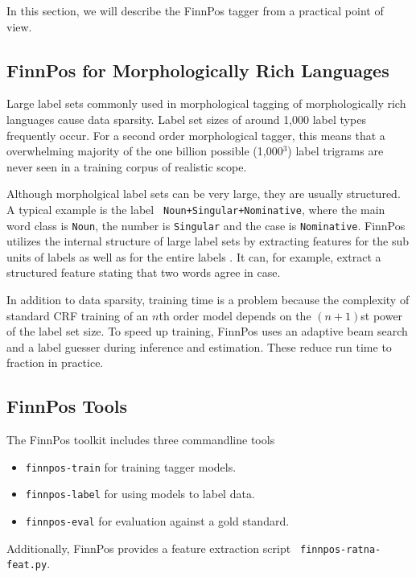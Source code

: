 \documentclass{llncs}
\begin{document}
In this section, we will describe the FinnPos tagger from a
practical point of view.

\subsection{FinnPos for Morphologically Rich Languages}

Large label sets commonly used in morphological tagging of
morphologically rich languages cause data sparsity. Label set sizes of
around 1,000 label types frequently occur. For a second order
morphological tagger, this means that a overwhelming majority of the
one billion possible (1,000$^3$) label trigrams are never seen in a
training corpus of realistic scope.

Although morpholgical label sets can be very large, they are usually
structured. A typical example is the label {\tt
  Noun+Singular+Nominative}, where the main word class is {\tt Noun},
the number is {\tt Singular} and the case is {\tt Nominative}. FinnPos
utilizes the internal structure of large label sets by extracting
features for the sub units of labels as well as for the entire labels
\cite{silfverberg2014}. It can, for example, extract a structured
feature stating that two words agree in case.

In addition to data sparsity, training time is a problem because the
complexity of standard CRF training of an $n$th order model depends on
the $(n+1)$st power of the label set size. To speed up training,
FinnPos uses an adaptive beam search and a label guesser
\cite{silfverberg2015} during inference and estimation. These reduce
run time to fraction in practice.

\subsection{FinnPos Tools}

The FinnPos toolkit includes three commandline tools

\begin{itemize}
\item {\tt finnpos-train} for training tagger models.
\item {\tt finnpos-label} for using models to label data.
\item {\tt finnpos-eval} for evaluation against a gold standard.
\end{itemize}

Additionally, FinnPos provides a feature extraction script {\tt
  finnpos-ratna-feat.py}.
\end{document}
